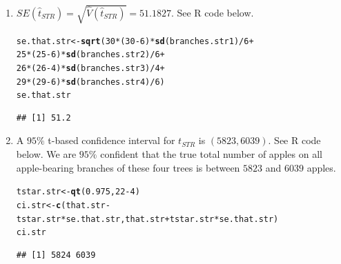 \documentclass[12pt]{article}\usepackage[]{graphicx}\usepackage[]{color}
\makeatletter
\newcommand{\hlnum}[1]{\textcolor[rgb]{0.686,0.059,0.569}{#1}}%
\newcommand{\hlopt}[1]{\textcolor[rgb]{0,0,0}{#1}}%
\newcommand{\hlstd}[1]{\textcolor[rgb]{0.345,0.345,0.345}{#1}}%
\newcommand{\hlkwb}[1]{\textcolor[rgb]{0.69,0.353,0.396}{#1}}%
\newcommand{\hlkwd}[1]{\textcolor[rgb]{0.737,0.353,0.396}{\textbf{#1}}}%
\newenvironment{kframe}{%
 \def\at@end@of@kframe{}%
 \ifinner\ifhmode%
  \def\at@end@of@kframe{\end{minipage}}%
  \begin{minipage}{\columnwidth}%
 \fi\fi%
 \def\FrameCommand##1{\hskip\@totalleftmargin \hskip-\fboxsep
 \colorbox{shadecolor}{##1}\hskip-\fboxsep
     \hskip-\linewidth \hskip-\@totalleftmargin \hskip\columnwidth}%
 \MakeFramed {\advance\hsize-\width
   \@totalleftmargin\z@ \linewidth\hsize
   \@setminipage}}%
 {\par\unskip\endMakeFramed%
 \at@end@of@kframe}
\newenvironment{knitrout}{}{} %
\makeatother
\begin{document}
\begin{doublespacing}
\begin{enumerate}
\begin{enumerate}
\item $SE(\hat{t}_{STR}) = \sqrt{\hat{V}(\hat{t}_{STR})} = 51.1827$. See R code below.

\begin{knitrout}\footnotesize
{}\color{fgcolor}\begin{kframe}
\begin{alltt}
\hlstd{se.that.str} \hlkwb{<-} \hlkwd{sqrt}\hlstd{(}\hlnum{30} \hlopt{*} \hlstd{(}\hlnum{30}\hlopt{-}\hlnum{6}\hlstd{)} \hlopt{*} \hlkwd{sd}\hlstd{(branches.str1)} \hlopt{/} \hlnum{6} \hlopt{+}
                      \hlnum{25} \hlopt{*} \hlstd{(}\hlnum{25}\hlopt{-}\hlnum{6}\hlstd{)} \hlopt{*} \hlkwd{sd}\hlstd{(branches.str2)} \hlopt{/} \hlnum{6} \hlopt{+}
                      \hlnum{26} \hlopt{*} \hlstd{(}\hlnum{26}\hlopt{-}\hlnum{4}\hlstd{)} \hlopt{*} \hlkwd{sd}\hlstd{(branches.str3)} \hlopt{/} \hlnum{4} \hlopt{+}
                      \hlnum{29} \hlopt{*} \hlstd{(}\hlnum{29}\hlopt{-}\hlnum{6}\hlstd{)} \hlopt{*} \hlkwd{sd}\hlstd{(branches.str4)} \hlopt{/} \hlnum{6}\hlstd{)}
\hlstd{se.that.str}
\end{alltt}
\begin{verbatim}
## [1] 51.2
\end{verbatim}
\end{kframe}
\end{knitrout}

\item A $95\%$ t-based confidence interval for $t_{STR}$ is $(5823, 6039)$. See R code below. We are $95\%$ confident that the true total number of apples on all apple-bearing branches of these four trees is between $5823$ and $6039$ apples.

\begin{knitrout}\footnotesize
{}\color{fgcolor}\begin{kframe}
\begin{alltt}
\hlstd{tstar.str} \hlkwb{<-} \hlkwd{qt}\hlstd{(}\hlnum{0.975}\hlstd{,} \hlnum{22}\hlopt{-}\hlnum{4}\hlstd{)}
\hlstd{ci.str} \hlkwb{<-} \hlkwd{c}\hlstd{(that.str}\hlopt{-}\hlstd{tstar.str}\hlopt{*}\hlstd{se.that.str, that.str}\hlopt{+}\hlstd{tstar.str}\hlopt{*}\hlstd{se.that.str)}
\hlstd{ci.str}
\end{alltt}
\begin{verbatim}
## [1] 5824 6039
\end{verbatim}
\end{kframe}
\end{knitrout}


\end{enumerate}
\end{enumerate}
\end{doublespacing}
\end{document}
